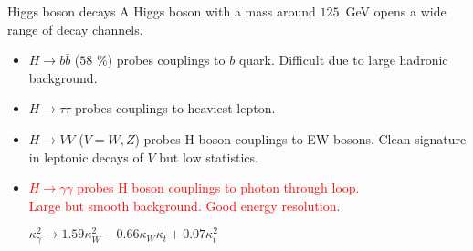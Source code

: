 \begin{frame}{Higgs boson decays}
  A Higgs boson with a mass around $125$~GeV opens a wide range of decay channels.
  
  \begin{minipage}{0.49\linewidth}
  \end{minipage}
  \hfill
  \begin{minipage}{0.49\linewidth}
    \begin{itemize}
    \item $H\rightarrow b\bar{b}$ ($58$ \%) probes couplings to $b$ quark.
      Difficult due to large hadronic background.
    \item $H\rightarrow \tau\tau$ probes couplings to heaviest lepton.
    \item $H\rightarrow VV$ ($V=W,Z$) probes H boson couplings to EW bosons.
      Clean signature in leptonic decays of $V$ but low statistics.
    \end{itemize}
  \end{minipage}
  \begin{itemize}
    \item \textcolor{red}{$H\rightarrow\gamma\gamma$ probes H boson couplings to photon through loop.\\
      Large but smooth background. Good energy resolution.}\\
      \begin{center} $\kappa_\gamma^2 \rightarrow 1.59\kappa_W^2 -0.66\kappa_W\kappa_t + 0.07\kappa_t^2$\end{center}
\end{itemize}
\end{frame}
